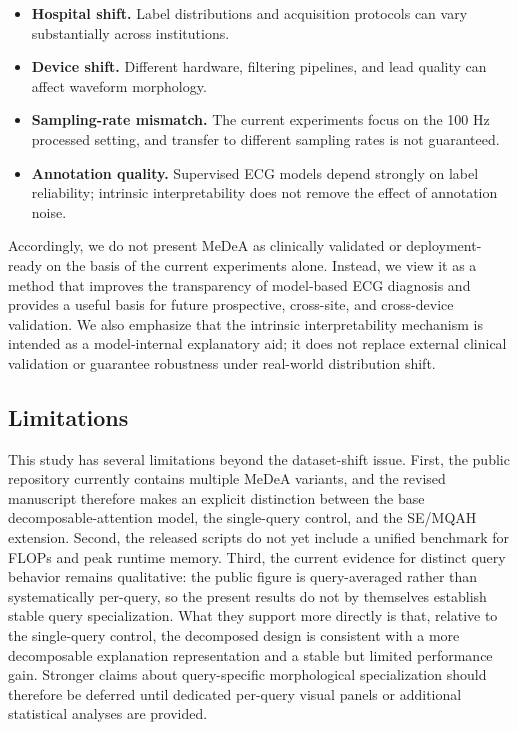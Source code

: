 \documentclass[11pt]{article}
\begin{document}
\begin{itemize}
    \item \textbf{Hospital shift.} Label distributions and acquisition protocols can vary substantially across institutions.
    \item \textbf{Device shift.} Different hardware, filtering pipelines, and lead quality can affect waveform morphology.
    \item \textbf{Sampling-rate mismatch.} The current experiments focus on the 100 Hz processed setting, and transfer to different sampling rates is not guaranteed.
    \item \textbf{Annotation quality.} Supervised ECG models depend strongly on label reliability; intrinsic interpretability does not remove the effect of annotation noise.
\end{itemize}

Accordingly, we do not present MeDeA as clinically validated or deployment-ready on the basis of the current experiments alone. Instead, we view it as a method that improves the transparency of model-based ECG diagnosis and provides a useful basis for future prospective, cross-site, and cross-device validation. We also emphasize that the intrinsic interpretability mechanism is intended as a model-internal explanatory aid; it does not replace external clinical validation or guarantee robustness under real-world distribution shift.

\subsection{Limitations}

This study has several limitations beyond the dataset-shift issue. First, the public repository currently contains multiple MeDeA variants, and the revised manuscript therefore makes an explicit distinction between the base decomposable-attention model, the single-query control, and the SE/MQAH extension. Second, the released scripts do not yet include a unified benchmark for FLOPs and peak runtime memory. Third, the current evidence for distinct query behavior remains qualitative: the public figure is query-averaged rather than systematically per-query, so the present results do not by themselves establish stable query specialization. What they support more directly is that, relative to the single-query control, the decomposed design is consistent with a more decomposable explanation representation and a stable but limited performance gain. Stronger claims about query-specific morphological specialization should therefore be deferred until dedicated per-query visual panels or additional statistical analyses are provided.
\end{document}
